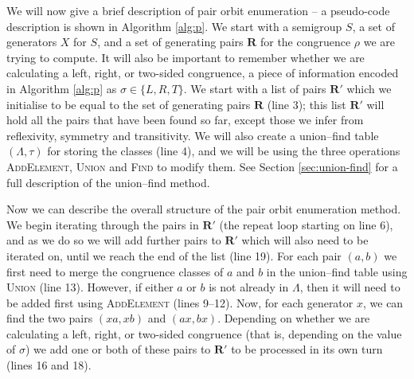 We will now give a brief description of pair orbit enumeration -- a pseudo-code
description is shown in Algorithm \ref{alg:p}.  We start with a semigroup $S$, a
set of generators $X$ for $S$, and a set of generating pairs $\mathbf{R}$ for
the congruence $\rho$ we are trying to compute.  It will also be important to
remember whether we are calculating a left, right, or two-sided congruence, a
piece of information encoded in Algorithm \ref{alg:p} as $\sigma \in \{L,R,T\}$.
We start with a list of pairs $\mathbf{R}'$ which we initialise to be equal to
the set of generating pairs $\mathbf{R}$ (line 3); this list $\mathbf{R}'$ will hold all
the pairs that have been found so far, except those we infer from reflexivity,
symmetry and transitivity.  We will also create a union--find table
$(\Lambda,\tau)$ for storing the classes (line 4), and we will be using the three
operations \textsc{AddElement}, \textsc{Union} and \textsc{Find} to modify them.
See Section \ref{sec:union-find} for a full description of the union--find
method.

Now we can describe the overall structure of the pair orbit enumeration method.
We begin iterating through the pairs in $\mathbf{R}'$ (the repeat loop starting on line 6), and as we do so we
will add further pairs to $\mathbf{R}'$ which will also need to be iterated on,
until we reach the end of the list (line 19).  For each pair $(a,b)$ we first need to
merge the congruence classes of $a$ and $b$ in the union--find table using
\textsc{Union} (line 13).  However, if either $a$ or $b$ is not
already in $\Lambda$, then it will need to be added first using \textsc{AddElement} (lines 9--12).  Now,
for each generator $x$, we can find the two pairs $(xa,xb)$ and $(ax,bx)$.
Depending on whether we are calculating a left, right, or two-sided congruence
(that is, depending on the value of $\sigma$)
we add one or both of these pairs to $\mathbf{R}'$ to be processed in its own
turn (lines 16 and 18).

